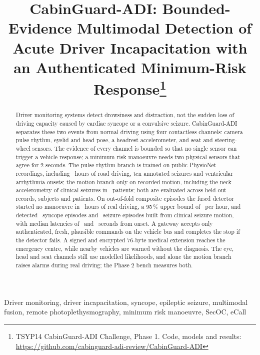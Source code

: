 \documentclass[conference]{IEEEtran}
\begin{document}
\title{CabinGuard-ADI: Bounded-Evidence Multimodal Detection of Acute Driver Incapacitation with an Authenticated Minimum-Risk Response\thanks{TSYP14 CabinGuard-ADI Challenge, Phase 1. Code, models and results: \protect\url{https://github.com/cabinguard-adi-review/CabinGuard-ADI}}}

\author{
}

\maketitle

\begin{abstract}
Driver monitoring systems detect drowsiness and distraction, not the sudden loss of driving capacity caused by cardiac syncope or a convulsive seizure. CabinGuard-ADI separates these two events from normal driving using four contactless channels: camera pulse rhythm, eyelid and head pose, a headrest accelerometer, and seat and steering-wheel sensors. The evidence of every channel is bounded so that no single sensor can trigger a vehicle response; a minimum risk manoeuvre needs two physical sensors that agree for 2 seconds. The pulse-rhythm branch is trained on public PhysioNet recordings, including \DriveHours\ hours of road driving, ten annotated seizures and ventricular arrhythmia onsets; the motion branch only on recorded motion, including the neck accelerometry of clinical seizures in \MrSzBgPatients\ patients; both are evaluated across held-out records, subjects and patients. On out-of-fold composite episodes the fused detector started no manoeuvre in \FusionHours\ hours of real driving, a 95\,\% upper bound of \FaFullUpper\ per hour, and detected \SyFull\ syncope episodes and \SzFull\ seizure episodes built from clinical seizure motion, with median latencies of \LatSyFull\ and \LatSzFull\ seconds from onset. A gateway accepts only authenticated, fresh, plausible commands on the vehicle bus and completes the stop if the detector fails. A signed and encrypted 76-byte medical extension reaches the emergency centre, while nearby vehicles are warned without the diagnosis. The eye, head and seat channels still use modelled likelihoods, and alone the motion branch raises alarms during real driving; the Phase 2 bench measures both.
\end{abstract}

\begin{IEEEkeywords}
Driver monitoring, driver incapacitation, syncope, epileptic seizure, multimodal fusion, remote photoplethysmography, minimum risk manoeuvre, SecOC, eCall
\end{IEEEkeywords}
\end{document}
